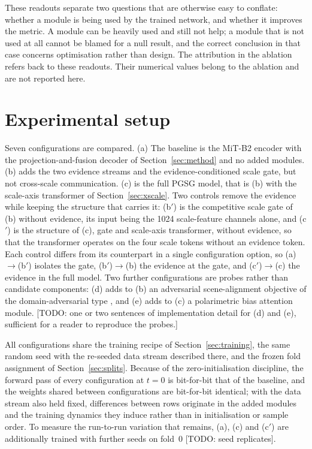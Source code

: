 \documentclass[preprint,12pt,authoryear]{elsarticle}
\begin{document}
These readouts separate two questions that are otherwise easy to conflate:
whether a module is being used by the trained network, and whether it
improves the metric. A module can be heavily used and still not help; a
module that is not used at all cannot be blamed for a null result, and the
correct conclusion in that case concerns optimisation rather than design. The
attribution in the ablation refers back to these readouts. Their numerical
values belong to the ablation and are not reported here.


\section{Experimental setup}
\label{sec:experiments}

Seven configurations are compared. (a) The baseline is the MiT-B2 encoder
with the projection-and-fusion decoder of Section~\ref{sec:method} and no added
modules. (b) adds the two evidence streams and the evidence-conditioned scale
gate, but not cross-scale communication. (c) is the full PGSG model, that is
(b) with the scale-axis transformer of Section~\ref{sec:xscale}. Two controls
remove the evidence while keeping the structure that carries it: (b$'$) is the
competitive scale gate of (b) without evidence, its input being the 1024
scale-feature channels alone, and (c$'$) is the structure of (c), gate and
scale-axis transformer, without evidence, so that the transformer operates on
the four scale tokens without an evidence token. Each control differs from its
counterpart in a single configuration option, so (a)$\rightarrow$(b$'$)
isolates the gate, (b$'$)$\rightarrow$(b) the evidence at the gate, and
(c$'$)$\rightarrow$(c) the evidence in the full model.
Two further
configurations are probes rather than candidate components: (d) adds to (b) an
adversarial scene-alignment objective of the domain-adversarial type
\citep{ganin2016dann}, and (e) adds to (c) a polarimetric bias attention module.
[TODO: one or two sentences of implementation detail for (d) and (e), sufficient
for a reader to reproduce the probes.]

All configurations share the training recipe of Section~\ref{sec:training}, the
same random seed with the re-seeded data stream described there, and the frozen
fold assignment of Section~\ref{sec:splits}. Because of the
zero-initialisation discipline, the forward pass of every configuration at $t=0$
is bit-for-bit that of the baseline, and the weights shared between
configurations are bit-for-bit identical; with the data stream also held fixed,
differences between rows originate in the added modules and the training
dynamics they induce rather than in initialisation or sample order. To measure
the run-to-run variation that remains, (a), (c) and (c$'$) are additionally
trained with further seeds on fold~0 [TODO: seed replicates].
\end{document}
